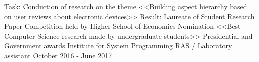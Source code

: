 \begin{cventries}



\cventry
{Task: Conduction of research on the theme <<Building aspect hierarchy based on user reviews about electronic devices>>
		\newline Result: Laureate of Student Research Paper Competition held by Higher School of Economics
		\newline Nomination <<Best Computer Science research made by undergraduate students>>
		\newline Presidential and Government awards
		\newline
	} %
{Institute for System Programming RAS / Laboratory assistant} %
{} %
{October 2016 - June 2017} %
\noindent	



\end{cventries}